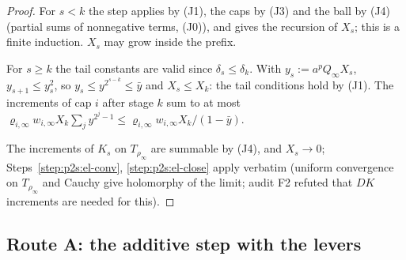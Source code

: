\begin{proof}
\label{step:p2s2:en-pre}
For $s<k$ the step applies by (J1), the caps by (J3) and the ball by (J4) (partial sums of nonnegative terms, (J0)), and gives the recursion of
$X_s$; this is a finite induction. $X_s$ may grow inside the prefix.

\label{step:p2s2:en-tail}
For $s\ge k$ the tail constants are valid since $\delta_s\le\delta_k$. With $y_s:=a^pQ_\infty X_s$, $y_{s+1}\le y_s^2$, so $y_s\le y^{2^{s-k}}\le\bar y$ and $X_s\le X_k$: the
tail conditions hold by (J1). The increments of cap $i$ after stage $k$ sum to at most $\varrho_{i,\infty}w_{i,\infty}X_k\sum_jy^{2^j-1}\le\varrho_{i,\infty}w_{i,\infty}X_k/(1-\bar y)$.

\label{step:p2s2:en-lim}
The increments of $K_s$ on $T_{\rho_\infty}$ are summable by (J4), and $X_s\to0$; Steps~\ref{step:p2s:el-conv}, \ref{step:p2s:el-close} apply verbatim
(uniform convergence on $T_{\rho_\infty}$ and Cauchy give holomorphy of the limit; audit F2 refuted that $DK$ increments are needed for this).
\end{proof}

\subsection{Route A: the additive step with the levers}\label{bp:p2s2:sec-A}

